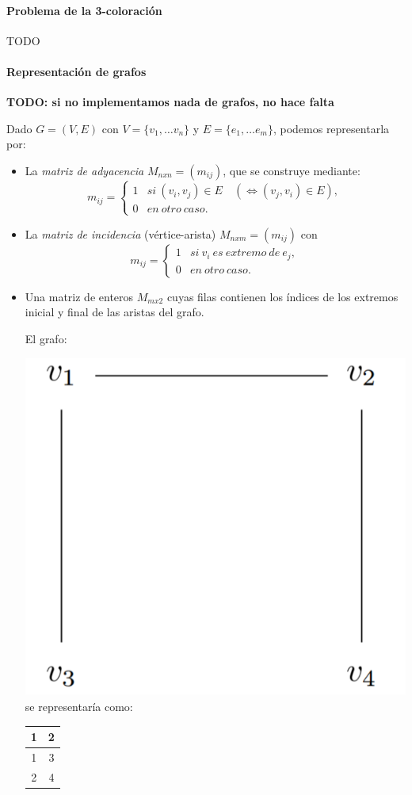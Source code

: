 \hfil




\paragraph{Problema de la 3-coloración}

\hfil

TODO




\paragraph{Representación de grafos}
\textbf{TODO: si no implementamos nada de grafos, no hace falta}

\hfil

Dado $G=(V,E)$ con $V=\{v_1,\dots v_n\}$ y $E=\{e_1,\dots e_m\}$, podemos representarla por:

\begin{itemize}
	\item  La \textit{matriz de adyacencia} $M_{nxn} = (m_{ij})$, que se construye mediante:
	\[
	m_{ij} =
	\begin{cases}
	1 & si\ (v_i,v_j) \in E \quad ( \Leftrightarrow (v_j,v_i)\in E ), \\
	0 & en\ otro\ caso.
	\end{cases}
	\]
	
	\item La \textit{matriz de incidencia} (vértice-arista) $M_{nxm} = (m_{ij})$ con
	\[
	m_{ij} =
	\begin{cases}
	1 & si\ v_i\ es\ extremo\ de\ e_j, \\
	0 & en\ otro\ caso.
	\end{cases}
	\]
	
	\item Una matriz de enteros $M_{mx2}$ cuyas filas contienen los índices de los extremos inicial y final de las aristas del grafo.
	
	\begin{example}
		El grafo:
		
		\includegraphics[width=.2\linewidth]{gfx/exgraph}
		\qquad se representaría como: \qquad
		\begin{tabular}{|c|c|}
			\hline	1 & 2 \\ \hline 1 & 3 \\ \hline 2 & 4 \\ \hline
		\end{tabular}	
		
	\end{example}
	
\end{itemize}
